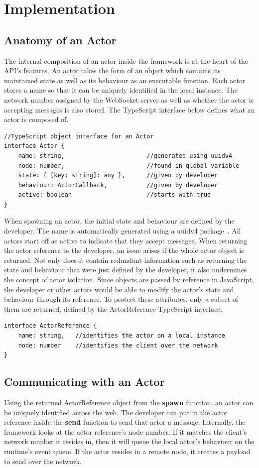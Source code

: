 \documentclass[oneside]{um-fict}
\begin{document}
\section{Implementation}\label{section:implementation}
\subsection{Anatomy of an Actor}
The internal composition of an actor inside the framework is at the heart of the API's features. An actor takes the form of an object which contains its maintained state as well as its behaviour as an executable function. Each actor stores a name so that it can be uniquely identified in the local instance. The network number assigned by the WebSocket server as well as whether the actor is accepting messages is also stored. The TypeScript interface below defines what an actor is composed of.
\begin{lstlisting}
//TypeScript object interface for an Actor
interface Actor {
    name: string,                       //generated using uuidv4
    node: number,                       //found in global variable
    state: { [key: string]: any },      //given by developer
    behaviour: ActorCallback,           //given by developer
    active: boolean                     //starts with true
}
\end{lstlisting}
When spawning an actor, the initial state and behaviour are defined by the developer. The name is automatically generated using a uuidv4 package~\cite{uuidv4}. All actors start off as active to indicate that they accept messages. When returning the actor reference to the developer, an issue arises if the whole actor object is returned. Not only does it contain redundant information such as returning the state and behaviour that were just defined by the developer, it also undermines the concept of actor isolation. Since objects are passed by reference in JavaScript, the developer or other actors would be able to modify the actor's state and behaviour through its reference. To protect these attributes, only a subset of them are returned, defined by the ActorReference TypeScript interface.
\begin{lstlisting}
interface ActorReference {
    name: string,   //identifies the actor on a local instance
    node: number    //identifies the client over the network
}
\end{lstlisting}
\subsection{Communicating with an Actor}
Using the returned ActorReference object from the \textbf{spawn} function, an actor can be uniquely identified across the web. The developer can put in the actor reference inside the \textbf{send} function to send that actor a message. Internally, the framework looks at the actor reference's node number. If it matches the client's network number it resides in, then it will queue the local actor's behaviour on the runtime's event queue. If the actor resides in a remote node, it creates a payload to send over the network. 
\end{document}
